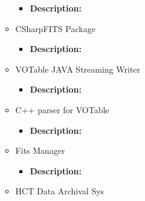 \begin{itemize}
\begin{itemize}
\begin{itemize}
\item \textbf{Description:}
\end{itemize}
\item CSharpFITS Package
\begin{itemize}
\item \textbf{Description:}
\end{itemize}
\item VOTable JAVA Streaming Writer
\begin{itemize}
\item \textbf{Description:}
\end{itemize}
\item C++ parser for VOTable
\begin{itemize}
\item \textbf{Description:}
\end{itemize}
\item Fits Manager
\begin{itemize}
\item \textbf{Description:}
\end{itemize}
\item HCT Data Archival Sys
\end{itemize}
\end{itemize}
